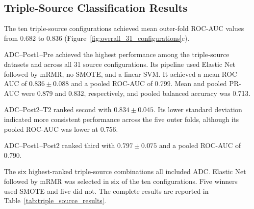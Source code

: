 \documentclass[12pt,twocolumn]{article}
\begin{document}
\subsection{Triple-Source Classification Results}
\label{subsec:triple_source_results}

The ten triple-source configurations achieved mean outer-fold ROC-AUC
values from 0.682 to 0.836
(Figure~\ref{fig:overall_31_configurations}c).

ADC--Post1--Pre achieved the highest performance among the
triple-source datasets and across all 31 source configurations. Its
pipeline used Elastic Net followed by mRMR, no SMOTE, and a linear
SVM. It achieved a mean ROC-AUC of
\(0.836 \pm 0.088\) and a pooled ROC-AUC of 0.799. Mean and pooled
PR-AUC were 0.879 and 0.832, respectively, and pooled balanced
accuracy was 0.713.

ADC--Post2--T2 ranked second with
\(0.834 \pm 0.045\). Its lower standard deviation indicated more
consistent performance across the five outer folds, although its
pooled ROC-AUC was lower at 0.756.

ADC--Post1--Post2 ranked third with
\(0.797 \pm 0.075\) and a pooled ROC-AUC of 0.790.

The six highest-ranked triple-source combinations all included ADC.
Elastic Net followed by mRMR was selected in six of the ten
configurations. Five winners used SMOTE and five did not. The complete
results are reported in Table~\ref{tab:triple_source_results}.
\end{document}

